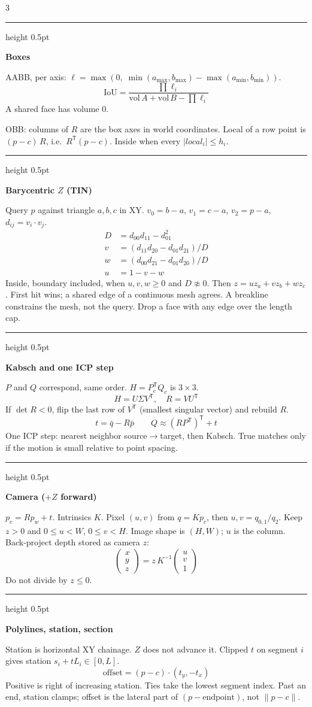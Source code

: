 \documentclass[8pt]{extarticle}
\newcommand{\sect}[1]{%
  \par\vspace{1.5pt}%
  {\color{navy}\hrule height 0.5pt}\par\vspace{0.7pt}%
  {\sffamily\bfseries\color{navy}#1}\par\vspace{0.2pt}%
}
\begin{document}
\begin{multicols}{3}
\sect{Boxes}
AABB, per axis: $\ell=\max(0,\;\min(a_{\max},b_{\max})-\max(a_{\min},b_{\min}))$.
\[
\mathrm{IoU}=\frac{\prod \ell_i}{\mathrm{vol}\,A+\mathrm{vol}\,B-\prod \ell_i}
\]
A shared face has volume 0.

OBB: columns of $R$ are the box axes in world coordinates. Local of a row point is $(p-c)\,R$, i.e.\ $R^{\mathsf T}(p-c)$. Inside when every $|local_i|\le h_i$.

\sect{Barycentric $Z$ (TIN)}
Query $p$ against triangle $a,b,c$ in XY. $v_0=b-a$, $v_1=c-a$, $v_2=p-a$, $d_{ij}=v_i\cdot v_j$.
\begin{align*}
D&=d_{00}d_{11}-d_{01}^{2}\\
v&=(d_{11}d_{20}-d_{01}d_{21})/D\\
w&=(d_{00}d_{21}-d_{01}d_{20})/D\\
u&=1-v-w
\end{align*}
Inside, boundary included, when $u,v,w\ge 0$ and $D\not\approx 0$. Then $z=u z_a+v z_b+w z_c$. First hit wins; a shared edge of a continuous mesh agrees. A breakline constrains the mesh, not the query. Drop a face with any edge over the length cap.

\sect{Kabsch and one ICP step}
$P$ and $Q$ correspond, same order. $H=P_c^{\mathsf T}Q_c$ is $3\times 3$.
\[
H=U\Sigma V^{\mathsf T},\quad
R=VU^{\mathsf T}
\]
If $\det R<0$, flip the last row of $V^{\mathsf T}$ (smallest singular vector) and rebuild $R$.
\[
t=\bar q-R\bar p
\qquad
Q\approx (RP^{\mathsf T})^{\mathsf T}+t
\]
One ICP step: nearest neighbor source$\to$target, then Kabsch. True matches only if the motion is small relative to point spacing.

\sect{Camera ($+Z$ forward)}
$p_c=Rp_w+t$. Intrinsics $K$. Pixel $(u,v)$ from $q=Kp_c$, then $u,v=q_{0,1}/q_2$.
Keep $z>0$ and $0\le u<W$, $0\le v<H$. Image shape is $(H,W)$; $u$ is the column.
Back-project depth stored as camera $z$:
\[
\begin{pmatrix}x\\y\\z\end{pmatrix}
=z\,K^{-1}\begin{pmatrix}u\\v\\1\end{pmatrix}
\]
Do not divide by $z\le 0$.

\sect{Polylines, station, section}
Station is horizontal XY chainage. $Z$ does not advance it. Clipped $t$ on segment $i$ gives station $s_i+tL_i\in[0,L]$.
\[
\mathrm{offset}=(p-c)\cdot(t_y,-t_x)
\]
Positive is right of increasing station. Ties take the lowest segment index. Past an end, station clamps; offset is the lateral part of $(p-\mathrm{endpoint})$, not $\|p-c\|$.


\end{multicols}
\end{document}
